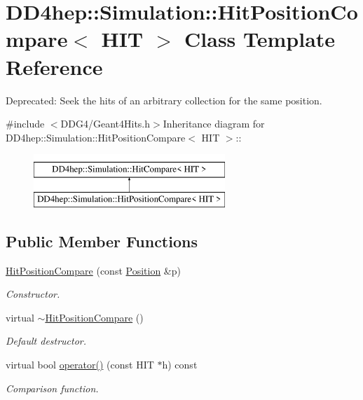 \hypertarget{struct_d_d4hep_1_1_simulation_1_1_hit_position_compare}{
\section{DD4hep::Simulation::HitPositionCompare$<$ HIT $>$ Class Template Reference}
\label{struct_d_d4hep_1_1_simulation_1_1_hit_position_compare}
}


Deprecated: Seek the hits of an arbitrary collection for the same position.  


{\ttfamily \#include $<$DDG4/Geant4Hits.h$>$}Inheritance diagram for DD4hep::Simulation::HitPositionCompare$<$ HIT $>$::\begin{figure}[H]
\begin{center}
\leavevmode
\includegraphics[height=2cm]{struct_d_d4hep_1_1_simulation_1_1_hit_position_compare}
\end{center}
\end{figure}
\subsection*{Public Member Functions}
\begin{DoxyCompactItemize}
\item 
\hyperlink{struct_d_d4hep_1_1_simulation_1_1_hit_position_compare_aa1d22cc065ef2af450b0d30188f1a1a7}{HitPositionCompare} (const \hyperlink{namespace_d_d4hep_1_1_simulation_ad6fd94b3439e31d1ba4b2e640d578558}{Position} \&p)
\begin{DoxyCompactList}\small\item\em Constructor. \item\end{DoxyCompactList}\item 
virtual \hyperlink{struct_d_d4hep_1_1_simulation_1_1_hit_position_compare_a0fa91c4c8ba1e1e4db40ed13c16421e6}{$\sim$HitPositionCompare} ()
\begin{DoxyCompactList}\small\item\em Default destructor. \item\end{DoxyCompactList}\item 
virtual bool \hyperlink{struct_d_d4hep_1_1_simulation_1_1_hit_position_compare_ac7b865b38eddb2c693d8a1eefa10d731}{operator()} (const HIT $\ast$h) const 
\begin{DoxyCompactList}\small\item\em Comparison function. \item\end{DoxyCompactList}\end{DoxyCompactItemize}
